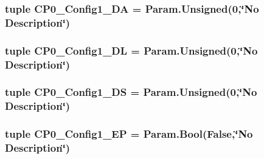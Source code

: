 \label{classMipsCPU_1_1BaseMipsCPU_aaeff852b614f4308b401eff35b4f81a7}
\hypertarget{classMipsCPU_1_1BaseMipsCPU_aed9348fd6efd10866faccf3bd9af0970}{
\subsubsection[{CP0\_\-Config1\_\-DA}]{\setlength{\rightskip}{0pt plus 5cm}tuple {\bf CP0\_\-Config1\_\-DA} = Param.Unsigned(0,\char`\"{}No Description\char`\"{})}}
\label{classMipsCPU_1_1BaseMipsCPU_aed9348fd6efd10866faccf3bd9af0970}
\hypertarget{classMipsCPU_1_1BaseMipsCPU_a43915e4c7bc247574811b326c7ae40ad}{
\subsubsection[{CP0\_\-Config1\_\-DL}]{\setlength{\rightskip}{0pt plus 5cm}tuple {\bf CP0\_\-Config1\_\-DL} = Param.Unsigned(0,\char`\"{}No Description\char`\"{})}}
\label{classMipsCPU_1_1BaseMipsCPU_a43915e4c7bc247574811b326c7ae40ad}
\hypertarget{classMipsCPU_1_1BaseMipsCPU_a76701d66f2d3b3e5a52d648144ea3d9f}{
\subsubsection[{CP0\_\-Config1\_\-DS}]{\setlength{\rightskip}{0pt plus 5cm}tuple {\bf CP0\_\-Config1\_\-DS} = Param.Unsigned(0,\char`\"{}No Description\char`\"{})}}
\label{classMipsCPU_1_1BaseMipsCPU_a76701d66f2d3b3e5a52d648144ea3d9f}
\hypertarget{classMipsCPU_1_1BaseMipsCPU_a2025f5f700685399c54697216521338e}{
\subsubsection[{CP0\_\-Config1\_\-EP}]{\setlength{\rightskip}{0pt plus 5cm}tuple {\bf CP0\_\-Config1\_\-EP} = Param.Bool(False,\char`\"{}No Description\char`\"{})}}
